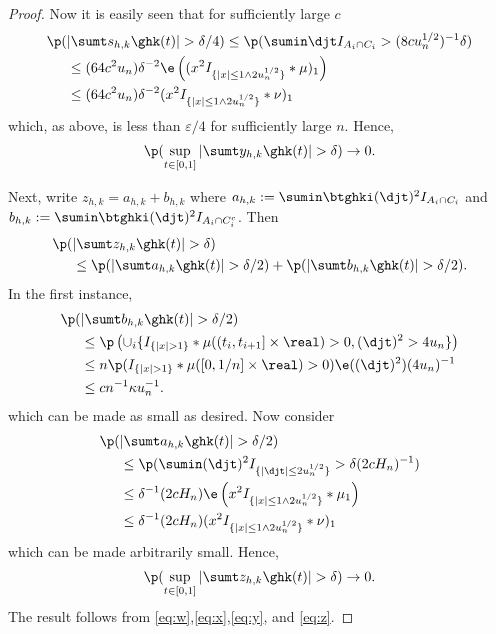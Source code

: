 \begin{proof}
Now it is easily seen that for sufficiently large $c$
\begin{align}
  \p(&\vert \sumt s_{h,k} \ghk(t) \vert > \delta/4) \le \p( \sumin  \djt I_{A_i \cap C_i} > (8 c u_n^{1/2})^{-1}\delta) \notag\\
  &\le (64 c^2 u_n)\delta^{-2} \e\left( (x^2I_{\{\vert x\vert \le 1 \wedge 2 u_n^{1/2}\}}\ast\mu)_1  \right)\notag \\
  & \le  (64 c^2 u_n)\delta^{-2} (x^2I_{\{\vert x\vert \le 1 \wedge 2 u_n^{1/2}\}}\ast\nu)_1
  \label{}
\end{align}
which, as above, is  less than $\varepsilon/4$ for sufficiently large $n$.
Hence, 
\begin{align}
  \notag
  \p(\sup_{t \in [0,1]}\vert \sumt y_{h,k} \ghk(t) \vert > \delta) \to 0.\label{eq:y}
\end{align}

Next,  write $z_{h,k} = a_{h,k} + b_{h,k}$ where $a_{h,k} :=  \sumin \btghki(\djt)^2I_{A_i \cap C_i}$ and  $b_{h,k} := \sumin \btghki(\djt)^2I_{A_i \cap C_i^c}$. Then 
\begin{align}
  \p(&\vert \sumt z_{h,k} \ghk(t) \vert   > \delta) \notag \\ &\le \p(\vert \sumt a_{h,k} \ghk(t) \vert > \delta/2) + \p(\vert \sumt b_{h,k} \ghk(t) \vert > \delta/2)\notag.
\end{align}
In the first instance,
\begin{align}
  \p(&\vert \sumt b_{h,k} \ghk(t) \vert > \delta/2) \notag \\ &\le
\p\left(\cup_i\{I_{\{\vert x \vert > 1\}}\ast \mu( (t_i, t_{i + 1}] \times \real) > 0   , (\djt)^2 > 4u_n\}\right) \notag \\
&\le n \p(I_{\{\vert x \vert > 1\}}\ast \mu( [0, 1/n] \times \real) > 0) \e((\djt)^2)(4u_n)^{-1}\notag \\
&\le cn^{-1}\kappa  u^{-1}_n.
\end{align}
which can be made as small as desired. Now consider
\begin{align}
  \p(&\vert \sumt a_{h,k} \ghk(t) \vert > \delta/2) \notag \\ &\le \p( \sumin (\djt)^2 I_{\{\vert \djt \vert \le 2u_n^{1/2} \}} > \delta (2 c H_n)^{-1} )\notag\\
  &\le\delta^{-1} (2 c H_n)\e\left( x^2I_{\{\vert x\vert \le 1 \wedge 2 u_n^{1/2}\}}\ast\mu_1  \right)\notag \\
  &\le \delta^{-1} (2 c H_n) (x^2I_{\{\vert x\vert \le 1 \wedge 2 u_n^{1/2}\}}\ast\nu)_1
\notag
  \label{}
\end{align}
which can be made arbitrarily small.
Hence, 
\begin{align}
  \p(\sup_{t \in [0,1]}\vert \sumt z_{h,k} \ghk(t) \vert > \delta) \to 0.\label{eq:z}
\end{align}
The result follows from \eqref{eq:w},\eqref{eq:x},\eqref{eq:y}, and \eqref{eq:z}.
\end{proof}

